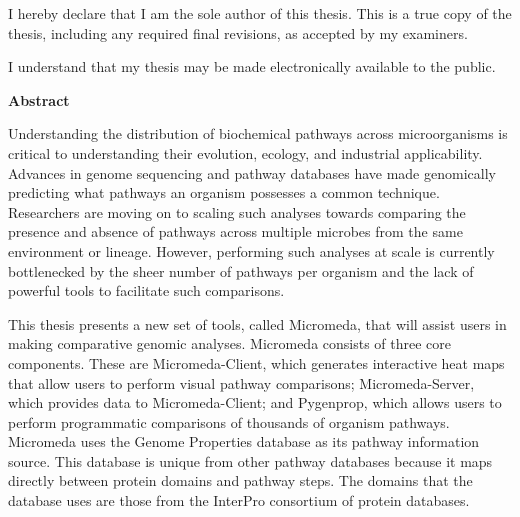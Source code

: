 \cleardoublepage %

  \noindent
I hereby declare that I am the sole author of this thesis. This is a true copy of the thesis, including any required final revisions, as accepted by my examiners.

  \bigskip
  
  \noindent
I understand that my thesis may be made electronically available to the public.

\cleardoublepage


\begin{center}\textbf{Abstract}\end{center}

Understanding the distribution of biochemical pathways across microorganisms is 
critical to understanding their evolution, ecology, and industrial 
applicability. Advances in genome sequencing and pathway databases have made 
genomically predicting what pathways an organism possesses a common technique. 
Researchers are moving on to scaling such analyses towards comparing the 
presence and absence of pathways across multiple microbes from the same 
environment or lineage. However, performing such analyses at scale is currently 
bottlenecked by the sheer number of pathways per organism and the lack of 
powerful tools to facilitate such comparisons. 

This thesis presents a new set of tools, called Micromeda, that will assist 
users in making comparative genomic analyses. Micromeda consists of three core 
components. These are Micromeda-Client, which generates interactive heat maps 
that allow users to perform visual pathway comparisons; Micromeda-Server, which 
provides data to Micromeda-Client; and Pygenprop, which allows users to perform 
programmatic comparisons of thousands of organism pathways. Micromeda uses the 
Genome Properties database as its pathway information source. This database is 
unique from other pathway databases because it maps directly between protein 
domains and pathway steps. The domains that the database uses are those from the 
InterPro consortium of protein databases. 

